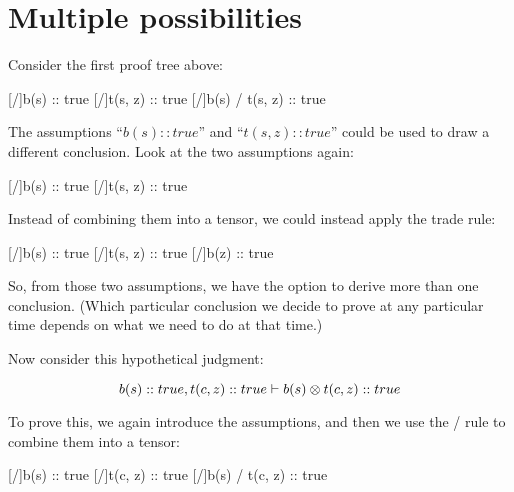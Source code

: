 \documentclass[../../../main.tex]{subfiles}
\begin{document}
\section{Multiple possibilities}

Consider the first proof tree above:

\begin{prooftree*}
  \hypo{}
  [\startrule/]{b(s) :: true}
  \hypo{}
  [\startrule/]{t(s, z) :: true}
  [\tensorIntro/]{b(s) \tensor/ t(s, z) :: true}
\end{prooftree*}

\noindent
The assumptions ``$b(s) :: true$'' and ``$t(s, z) :: true$'' could be used to draw a different conclusion. Look at the two assumptions again:

\begin{prooftree*}
  \hypo{}
  [\startrule/]{b(s) :: true}
  \hypo{}
  [\startrule/]{t(s, z) :: true}
\end{prooftree*}

\noindent
Instead of combining them into a tensor, we could instead apply the trade rule:

\begin{prooftree*}
  \hypo{}
  [\startrule/]{b(s) :: true}
  \hypo{}
  [\startrule/]{t(s, z) :: true}
  [\traderule/]{b(z) :: true}
\end{prooftree*}

\noindent
So, from those two assumptions, we have the option to derive more than one conclusion. (Which particular conclusion we decide to prove at any particular time depends on what we need to do at that time.)

Now consider this hypothetical judgment:

\begin{equation*}
  b(s) :: true, t(c, z) :: true \ndturnstile/ b(s) \tensor/ t(c, z) :: true
\end{equation*}

\noindent
To prove this, we again introduce the assumptions, and then we use the \tensorIntro/ rule to combine them into a tensor:

\begin{prooftree*}
  \hypo{}
  [\startrule/]{b(s) :: true}
  \hypo{}
  [\startrule/]{t(c, z) :: true}
  [\tensorIntro/]{b(s) \tensor/ t(c, z) :: true}
\end{prooftree*}
\end{document}
